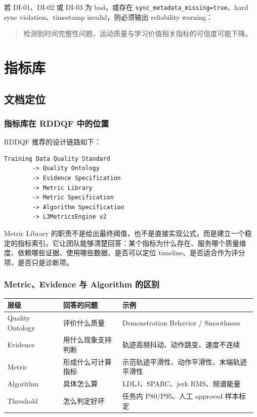 \documentclass[UTF8,zihao=-4,oneside,openany]{ctexrep}
\newcommand{\Code}[1]{\texttt{#1}}
\begin{document}
若 DI-01、DI-02 或 DI-03 为 bad，或存在 \Code{sync\_metadata\_missing=true}、hard sync violation、timestamp invalid，则必须输出 reliability warning：

\begin{quote}
检测到时间完整性问题，运动质量与学习价值相关指标的可信度可能下降。
\end{quote}

\clearpage

\chapter{指标库}

\section{文档定位}

\subsection{指标库在 RDDQF 中的位置}

RDDQF 推荐的设计链路如下：

\begin{verbatim}
Training Data Quality Standard
        -> Quality Ontology
        -> Evidence Specification
        -> Metric Library
        -> Metric Specification
        -> Algorithm Specification
        -> L3MetricsEngine v2
\end{verbatim}

Metric Library 的职责不是给出最终阈值，也不是直接实现公式，而是建立一个稳定的指标索引。它让团队能够清楚回答：某个指标为什么存在、服务哪个质量维度、依赖哪些证据、使用哪些数据、是否可以定位 timeline、是否适合作为评分项、是否只是诊断项。

\subsection{Metric、Evidence 与 Algorithm 的区别}

\begin{longtable}{L{3.2cm} L{4.0cm} L{6.8cm}}
\toprule
层级 & 回答的问题 & 示例 \\
\midrule
Quality Ontology & 评价什么质量 & Demonstration Behavior / Smoothness \\
Evidence & 用什么现象支持判断 & 轨迹高频抖动、动作跳变、速度不连续 \\
Metric & 形成什么可计算指标 & 示范轨迹平滑性、动作平滑性、末端轨迹平滑性 \\
Algorithm & 具体怎么算 & LDLJ、SPARC、jerk RMS、频谱能量 \\
Threshold & 怎么判定好坏 & 任务内 P80/P95、人工 approved 样本标定 \\
\bottomrule
\end{longtable}
\end{document}
